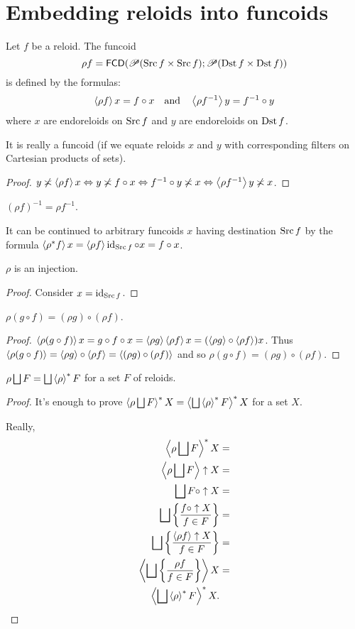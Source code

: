 \section{Embedding reloids into funcoids}
\begin{defn}
Let $f$ be a reloid. The funcoid
\[
\rho f=\mathsf{FCD}(\mathscr{P}(\operatorname{Src} f\times\operatorname{Src} f);\mathscr{P}(\operatorname{Dst} f\times\operatorname{Dst} f))
\]
is defined by the formulas:
\[
\left\langle \rho f\right\rangle x=f\circ x\quad\text{and}\quad\left\langle \rho f^{-1}\right\rangle y=f^{-1}\circ y
\]
where $x$ are endoreloids on $\operatorname{Src} f$ and $y$ are endoreloids on
$\operatorname{Dst} f$.\end{defn}
\begin{prop}
It is really a funcoid (if we equate reloids $x$ and $y$ with corresponding
filters on Cartesian products of sets).\end{prop}
\begin{proof}
$y\not\asymp\left\langle \rho f\right\rangle x\Leftrightarrow y\not\asymp f\circ x\Leftrightarrow f^{-1}\circ y\not\asymp x\Leftrightarrow\left\langle \rho f^{-1}\right\rangle y\not\asymp x$.\end{proof}
\begin{cor}
$(\rho f)^{-1}=\rho f^{-1}$.\end{cor}
\begin{defn}
It can be continued to arbitrary funcoids $x$ having destination
$\operatorname{Src} f$ by the formula $\left\langle \rho^{\ast}f\right\rangle x=\left\langle \rho f\right\rangle\operatorname{id}_{\operatorname{Src} f}\circ x=f\circ x$.\end{defn}
\begin{prop}
$\rho$ is an injection.\end{prop}
\begin{proof}
Consider $x=\operatorname{id}_{\operatorname{Src} f}$.\end{proof}
\begin{prop}
$\rho(g\circ f)=(\rho g)\circ(\rho f)$.\end{prop}
\begin{proof}
$\left\langle \rho(g\circ f)\right\rangle x=g\circ f\circ x=\left\langle \rho g\right\rangle\left\langle \rho f\right\rangle x=(\left\langle \rho g\right\rangle\circ\left\langle \rho f\right\rangle)x$.
Thus $\left\langle \rho(g\circ f)\right\rangle=\left\langle \rho g\right\rangle\circ\left\langle \rho f\right\rangle=\left\langle (\rho g)\circ(\rho f)\right\rangle$
and so $\rho(g\circ f)=(\rho g)\circ(\rho f)$.\end{proof}
\begin{thm}
$\rho\bigsqcup F=\bigsqcup\left\langle \rho\right\rangle ^{\ast}F$ for a set $F$ of reloids.\end{thm}
\begin{proof}
It's enough to prove $\left\langle \rho\bigsqcup F\right\rangle ^{\ast}X=\left\langle \bigsqcup\left\langle \rho\right\rangle ^{\ast}F\right\rangle ^{\ast}X$
for a set $X$.

Really,
\begin{align*}
\left\langle \rho\bigsqcup F\right\rangle ^{\ast}X & =\\
\left\langle \rho\bigsqcup F\right\rangle\uparrow X & =\\
\bigsqcup F\circ\uparrow X & =\\
\bigsqcup\left\{ \frac{f\circ\uparrow X}{f\in F}\right\} & =\\
\bigsqcup\left\{ \frac{\left\langle \rho f\right\rangle\uparrow X}{f\in F}\right\} & =\\
\left\langle \bigsqcup\left\{ \frac{\rho f}{f\in F}\right\}\right\rangle X & =\\
\left\langle \bigsqcup\left\langle \rho\right\rangle ^{\ast}F\right\rangle ^{\ast}X.
\end{align*}
\end{proof}
